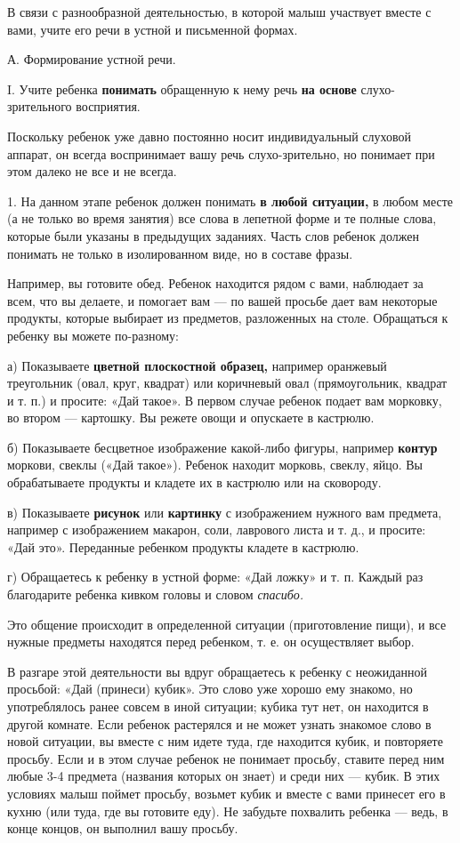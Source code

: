 \documentclass{book}
\renewcommand{\emph}[1]{\textit{#1}}
\begin{document}
В связи с разнообразной деятельностью, в которой малыш участвует вместе
с вами, учите его речи в устной и письменной формах.

А. Формирование устной речи.

I. Учите ребенка \textbf{понимать} обращенную к нему речь \textbf{на
основе} слухо-зрительного восприятия.

Поскольку ребенок уже давно постоянно носит индивидуальный слуховой
аппарат, он всегда воспринимает вашу речь слухо-зрительно, но понимает
при этом далеко не все и не всегда.

1. На данном этапе ребенок должен понимать \textbf{в любой ситуации,} в
любом месте (а не только во время занятия) все слова в лепетной форме и
те полные слова, которые были указаны в предыдущих заданиях. Часть слов
ребенок должен понимать не только в изолированном виде, но в составе
фразы.

Например, вы готовите обед. Ребенок находится рядом с вами, наблюдает за
всем, что вы делаете, и помогает вам --- по вашей просьбе дает вам
некоторые продукты, которые выбирает из предметов, разложенных на столе.
Обращаться к ребенку вы можете по-разному:

а) Показываете \textbf{цветной плоскостной образец,} например оранжевый
треугольник (овал, круг, квадрат) или коричневый овал (прямоугольник,
квадрат и т. п.) и просите: «Дай такое». В первом случае ребенок подает
вам морковку, во втором --- картошку. Вы режете овощи и опускаете в
кастрюлю.

б) Показываете бесцветное изображение какой-либо фигуры, например
\textbf{контур} моркови, свеклы («Дай такое»). Ребенок находит морковь,
свеклу, яйцо. Вы обрабатываете продукты и кладете их в кастрюлю или на
сковороду.

в) Показываете \textbf{рисунок} или \textbf{картинку} с изображением
нужного вам предмета, например с изображением макарон, соли, лаврового
листа и т. д., и просите: «Дай это». Переданные ребенком продукты
кладете в кастрюлю.

г) Обращаетесь к ребенку в устной форме: «Дай ложку» и т. п. Каждый раз
благодарите ребенка кивком головы и словом \emph{спасибо.}

Это общение происходит в определенной ситуации (приготовление пищи), и
все нужные предметы находятся перед ребенком, т. е. он осуществляет
выбор.

В разгаре этой деятельности вы вдруг обращаетесь к ребенку с неожиданной
просьбой: «Дай (принеси) кубик». Это слово уже хорошо ему знакомо, но
употреблялось ранее совсем в иной ситуации; кубика тут нет, он находится
в другой комнате. Если ребенок растерялся и не может узнать знакомое
слово в новой ситуации, вы вместе с ним идете туда, где находится кубик,
и повторяете просьбу. Если и в этом случае ребенок не понимает просьбу,
ставите перед ним любые 3-4 предмета (названия которых он знает) и среди
них --- кубик. В этих условиях малыш поймет просьбу, возьмет кубик и
вместе с вами принесет его в кухню (или туда, где вы готовите еду). Не
забудьте похвалить ребенка --- ведь, в конце концов, он выполнил вашу
просьбу.
\end{document}
